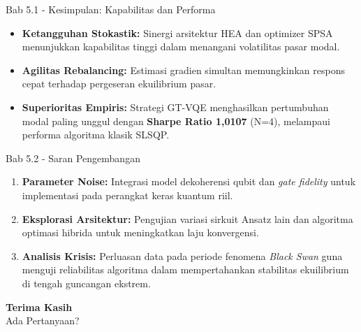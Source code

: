 \begin{frame}{Bab 5.1 - Kesimpulan: Kapabilitas dan Performa}
    \begin{itemize}
        \item \textbf{Ketangguhan Stokastik:} Sinergi arsitektur HEA dan optimizer SPSA menunjukkan kapabilitas tinggi dalam menangani volatilitas pasar modal.
        \item \textbf{Agilitas Rebalancing:} Estimasi gradien simultan memungkinkan respons cepat terhadap pergeseran ekuilibrium pasar.
        \item \textbf{Superioritas Empiris:} Strategi GT-VQE menghasilkan pertumbuhan modal paling unggul dengan \textbf{Sharpe Ratio 1,0107} (N=4), melampaui performa algoritma klasik SLSQP.
    \end{itemize}
\end{frame}

\begin{frame}{Bab 5.2 - Saran Pengembangan}
    \begin{enumerate}
        \item \textbf{Parameter Noise:} Integrasi model dekoherensi qubit dan \textit{gate fidelity} untuk implementasi pada perangkat keras kuantum riil.
        \item \textbf{Eksplorasi Arsitektur:} Pengujian variasi sirkuit Ansatz lain dan algoritma optimasi hibrida untuk meningkatkan laju konvergensi.
        \item \textbf{Analisis Krisis:} Perluasan data pada periode fenomena \textit{Black Swan} guna menguji reliabilitas algoritma dalam mempertahankan stabilitas ekuilibrium di tengah guncangan ekstrem.
    \end{enumerate}
    \vspace{0.8cm}
    \begin{center}
        \huge \textbf{Terima Kasih} \\
        \medskip
        \large Ada Pertanyaan?
    \end{center}
\end{frame}

